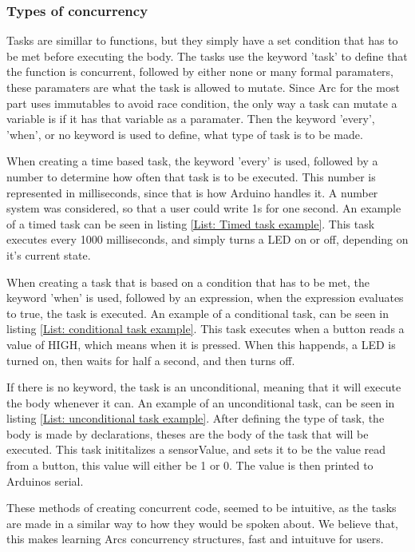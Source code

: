 \subsubsection{Types of concurrency}
Tasks are simillar to functions, but they simply have a set condition that has to be met before executing the body. The tasks use the keyword 'task' to define that the function is concurrent, followed by either none or many formal paramaters, these paramaters are what the task is allowed to mutate. Since Arc for the most part uses immutables to avoid race condition, the only way a task can mutate a variable is if it has that variable as a paramater. Then the keyword 'every', 'when', or no keyword is used to define, what type of task is to be made.

When creating a time based task, the keyword 'every' is used, followed by a number to determine how often that task is to be executed. This number is represented in milliseconds, since that is how Arduino handles it. A number system was considered, so that a user could write 1s for one second.
An example of a timed task can be seen in listing \ref*{List: Timed task example}. This task executes every 1000 milliseconds, and simply turns a LED on or off, depending on it's current state.

When creating a task that is based on a condition that has to be met, the keyword 'when' is used, followed by an expression, when the expression evaluates to true, the task is executed. An example of a conditional task, can be seen in listing \ref*{List: conditional task example}. This task executes when a button reads a value of HIGH, which means when it is pressed. When this happends, a LED is turned on, then waits for half a second, and then turns off.

If there is no keyword, the task is an unconditional, meaning that it will execute the body whenever it can. An example of an unconditional task, can be seen in listing \ref*{List: unconditional task example}. After defining the type of task, the body is made by declarations, theses are the body of the task that will be executed. This task inititalizes a sensorValue, and sets it to be the value read from a button, this value will either be 1 or 0. The value is then printed to Arduinos serial.

These methods of creating concurrent code, seemed to be intuitive, as the tasks are made in a similar way to how they would be spoken about. We believe that, this makes learning Arcs concurrency structures, fast and intuituve for users.


